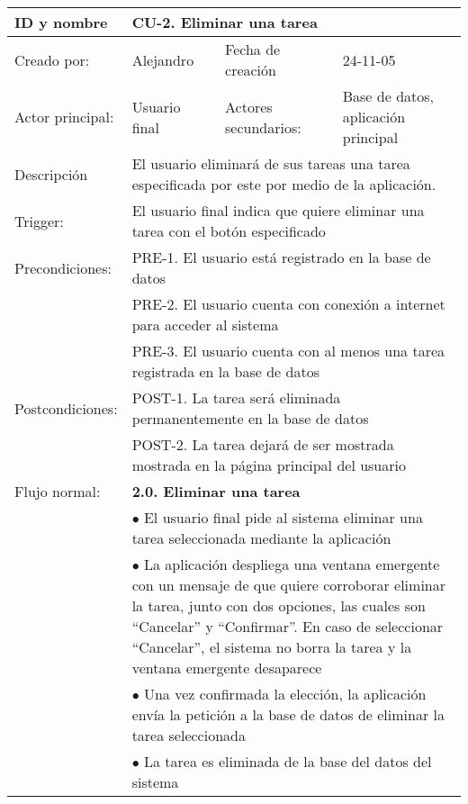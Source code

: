 \begin{longtable}[c]{p{3cm}p{5cm}p{4cm}p{2cm}}
  \endfirsthead
  \endhead
  \endfoot
  \hline
  ID y nombre & \multicolumn{3}{p{11cm}}{CU-2. Eliminar una tarea}\\
  \hline
  Creado por: & Alejandro & Fecha de creaci\'on & 24-11-05\\
  \hline
  Actor principal: & Usuario final & Actores secundarios: & Base de datos, aplicaci\'on principal\\
  \hline
  Descripci\'on & \multicolumn{3}{p{11cm}}{El usuario eliminar\'a de sus tareas una tarea especificada por este por medio de la aplicaci\'on.}\\
  \hline
  Trigger: & \multicolumn{3}{p{11cm}}{El usuario final indica que quiere eliminar una tarea con el bot\'on especificado}\\
  \hline
  Precondiciones: & \multicolumn{3}{p{11cm}}{PRE-1. El usuario est\'a registrado en la base de datos}\\
		  & \multicolumn{3}{p{11cm}}{PRE-2. El usuario cuenta con conexi\'on a internet para acceder al sistema}\\
		  & \multicolumn{3}{p{11cm}}{PRE-3. El usuario cuenta con al menos una tarea registrada en la base de datos}\\
  \hline
  Postcondiciones: & \multicolumn{3}{p{11cm}}{POST-1. La tarea ser\'a eliminada permanentemente en la base de datos}\\
		   & \multicolumn{3}{p{11cm}}{POST-2. La tarea dejar\'a de ser mostrada mostrada en la p\'agina principal del usuario}\\
  \hline
  Flujo normal: & \multicolumn{3}{p{11cm}}{\textbf{2.0. Eliminar una tarea}}\\
		& \multicolumn{3}{p{11cm}}{$\bullet$ El usuario final pide al sistema eliminar una tarea seleccionada mediante la aplicaci\'on}\\
		& \multicolumn{3}{p{11cm}}{$\bullet$ La aplicaci\'on despliega una ventana emergente con un mensaje de que quiere corroborar eliminar la tarea, junto con dos opciones, las cuales son ``Cancelar'' y ``Confirmar''. En caso de seleccionar ``Cancelar'', el sistema no borra la tarea y la ventana emergente desaparece}\\
		& \multicolumn{3}{p{11cm}}{$\bullet$ Una vez confirmada la elecci\'on, la aplicaci\'on env\'ia la petici\'on a la base de datos de eliminar la tarea seleccionada}\\
		& \multicolumn{3}{p{11cm}}{$\bullet$ La tarea es eliminada de la base del datos del sistema}\\

\end{longtable}
